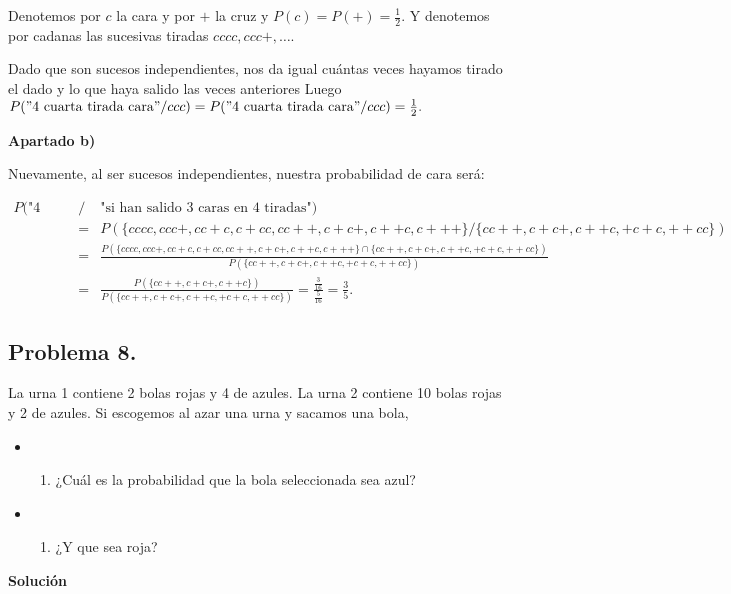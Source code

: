 \documentclass[
]{article}
\providecommand{\tightlist}{%
  \setlength{\itemsep}{0pt}\setlength{\parskip}{0pt}}
\begin{document}
Denotemos por \(c\) la cara y por \(+\) la cruz y
\(P(c)=P(+)=\frac{1}{2}\). Y denotemos por cadanas las sucesivas tiradas
\(cccc,ccc+,\ldots\).

Dado que son sucesos independientes, nos da igual cuántas veces hayamos
tirado el dado y lo que haya salido las veces anteriores Luego
\(P("\mbox{4 cuarta tirada cara}"/ccc)=P("\mbox{4 cuarta tirada cara}"/ccc)=\frac{1}{2}.\)

\textbf{Apartado b)}

Nuevamente, al ser sucesos independientes, nuestra probabilidad de cara
será:

\[
\begin{eqnarray*}
P(\mbox{"4 cuarta  tirada  cara"}&/& \mbox{"si han salido  3 caras en 4 tiradas"}) \\ 
& =& P(\{cccc,ccc+,cc+c,c+cc,cc++,c+c+,c++c,c+++\}/\{cc++,c+c+,c++c,+c+c,++cc\})\\
&=& \frac{P(\{cccc,ccc+,cc+c,c+cc,cc++,c+c+,c++c,c+++\}\cap \{cc++,c+c+,c++c,+c+c,++cc\})}{P(\{cc++,c+c+,c++c,+c+c,++cc\})}\\
&=& \frac{P(\{cc++,c+c+,c++c\})}{P(\{cc++,c+c+,c++c,+c+c,++cc\})}=\frac{\frac{3}{16}}{\frac{5}{16}}=\frac{3}{5}.
\end{eqnarray*}
\]

\hypertarget{problema-8.}{%
\subsection{Problema 8.}\label{problema-8.}}

La urna 1 contiene 2 bolas rojas y 4 de azules. La urna 2 contiene 10
bolas rojas y 2 de azules. Si escogemos al azar una urna y sacamos una
bola,

\begin{itemize}
\item
  \begin{enumerate}
  \def\labelenumi{\alph{enumi})}
  \tightlist
  \item
    ¿Cuál es la probabilidad que la bola seleccionada sea azul?
  \end{enumerate}
\item
  \begin{enumerate}
  \def\labelenumi{\alph{enumi})}
  \setcounter{enumi}{1}
  \tightlist
  \item
    ¿Y que sea roja?
  \end{enumerate}
\end{itemize}

\textbf{Solución}
\end{document}

